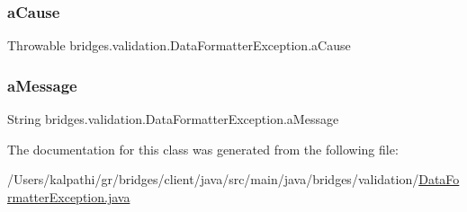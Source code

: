 \subsubsection{\texorpdfstring{a\+Cause}{aCause}}
{\footnotesize\ttfamily Throwable bridges.\+validation.\+Data\+Formatter\+Exception.\+a\+Cause}

\mbox{\label{classbridges_1_1validation_1_1_data_formatter_exception_a8cab4688a8a80a0575bcda28e6ac7b8c}} 
\subsubsection{\texorpdfstring{a\+Message}{aMessage}}
{\footnotesize\ttfamily String bridges.\+validation.\+Data\+Formatter\+Exception.\+a\+Message}



The documentation for this class was generated from the following file\+:\begin{DoxyCompactItemize}
\item 
/\+Users/kalpathi/gr/bridges/client/java/src/main/java/bridges/validation/\mbox{\hyperlink{_data_formatter_exception_8java}{Data\+Formatter\+Exception.\+java}}\end{DoxyCompactItemize}
